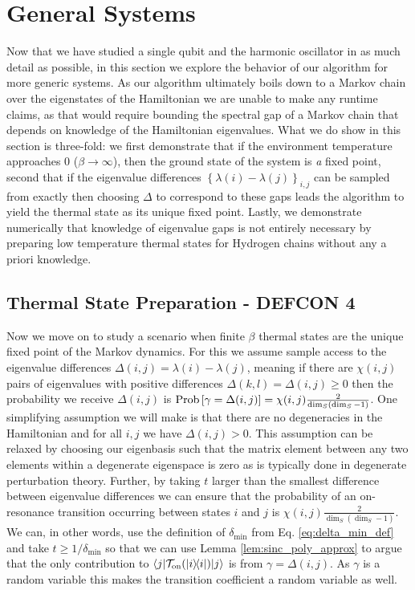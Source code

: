 \documentclass{article}
\newcommand{\on}{\rm on}
\newcommand{\ket}[1]{|#1\rangle}
\newcommand{\bra}[1]{\langle #1|}
\newcommand{\ketbra}[2]{| #1\rangle\! \langle #2|}
\newcommand{\set}[1]{\left\{ #1 \right\}}
\newcommand{\prob}[1]{{\rm Prob}\left[ #1 \right]}
\begin{document}
\section{General Systems} \label{sec:general_systems}
 Now that we have studied a single qubit and the harmonic oscillator in as much detail as possible, in this section we explore the behavior of our algorithm for more generic systems. As our algorithm ultimately boils down to a Markov chain over the eigenstates of the Hamiltonian we are unable to make any runtime claims, as that would require bounding the spectral gap of a Markov chain that depends on knowledge of the Hamiltonian eigenvalues. What we do show in this section is three-fold: we first demonstrate that if the environment temperature approaches 0 ($\beta \to \infty$), then the ground state of the system is \emph{a} fixed point, second that if the eigenvalue differences $\set{\lambda(i) - \lambda(j)}_{i, j}$ can be sampled from exactly then choosing $\Delta$ to correspond to these gaps leads the algorithm to yield the thermal state as its unique fixed point. Lastly, we demonstrate numerically that knowledge of eigenvalue gaps is not entirely necessary by preparing low temperature thermal states for Hydrogen chains without any a priori knowledge.

\subsection{Thermal State Preparation - DEFCON 4}

Now we move on to study a scenario when finite $\beta$ thermal states are the unique fixed point of the Markov dynamics. For this we assume sample access to the eigenvalue differences $\Delta(i,j) = \lambda(i) - \lambda(j)$, meaning if there are $\chi(i,j)$ pairs of eigenvalues with positive differences $\Delta(k,l) = \Delta(i,j) \ge 0$ then the probability we receive $\Delta(i,j)$ is $\prob{\gamma = \Delta(i,j)} = \chi(i,j) \frac{2}{\dim_S(\dim_S - 1)}$. One simplifying assumption we will make is that there are no degeneracies in the Hamiltonian and for all $i,j$ we have $\Delta(i,j) > 0$.  This assumption can be relaxed by choosing our eigenbasis such that the matrix element between any two elements within a degenerate eigenspace is zero as is typically done in degenerate perturbation theory.  Further, by taking $t$ larger than the smallest difference between eigenvalue differences we can ensure that the probability of an on-resonance transition occurring between states $i$ and $j$ is $\chi(i,j) \frac{2}{\dim_S(\dim_S - 1)}$. We can, in other words, use the definition of $\delta_{\min}$ from Eq. \eqref{eq:delta_min_def} and take $t \ge 1/ \delta_{\min}$ so that we can use Lemma \ref{lem:sinc_poly_approx} to argue that the only contribution to $\bra{j} \mathcal{T}_{\on}(\ketbra{i}{i}) \ket{j}$ is from $\gamma = \Delta(i,j)$. As $\gamma$ is a random variable this makes the transition coefficient a random variable as well. 
\end{document}
